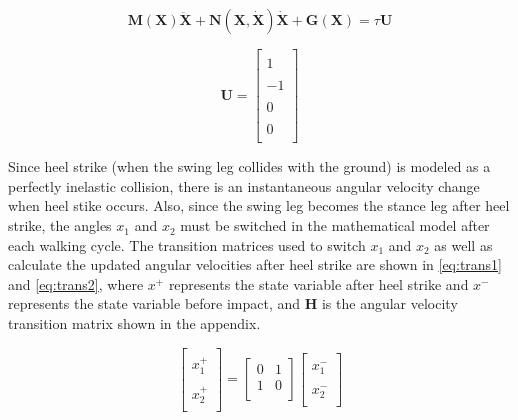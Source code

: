 \documentclass[smallextended]{./springer/svjour3}
\newcommand{\mb}[1]{\mathbf{#1}}
\begin{document}
\begin{equation}
\label{eq:swingeqn}
\mb{M(X)}\mb{\ddot{X}} + \mb{N(X, \dot{X})}\mb{\dot{X}} + \mb{G(X)} = \tau\mb{U}
\end{equation}

\begin{equation}
\label{eq:U}
\mb{U} = 
\begin{bmatrix}
\\1\\
\\-1\\
\\0\\
\\0\\
\end{bmatrix}
\end{equation}

Since heel strike (when the swing leg collides with the ground) is modeled as a perfectly inelastic 
collision, there is an instantaneous angular velocity change when heel stike occurs. Also, since the swing leg becomes the stance leg
after heel strike, the angles $x_1$ and $x_2$ must be switched in the mathematical model after each walking cycle. The transition matrices used to switch $x_1$ and $x_2$ as well 
as calculate the updated angular velocities after heel strike are shown in \ref{eq:trans1} and \ref{eq:trans2}, where $x^+$ represents the state
variable after heel strike and $x^-$ represents the state variable before impact, and $\mb{H}$ is the angular velocity transition matrix shown in the appendix.

\begin{equation}
\label{eq:trans1}
\begin{bmatrix}
\\x_1^+\\
\\x_2^+\\
\end{bmatrix}
 = 
\begin{bmatrix}
0 & 1\\
1 & 0\\
\end{bmatrix}
\begin{bmatrix}
\\x_1^-\\
\\x_2^-\\
\end{bmatrix}
\end{equation}
\end{document}
